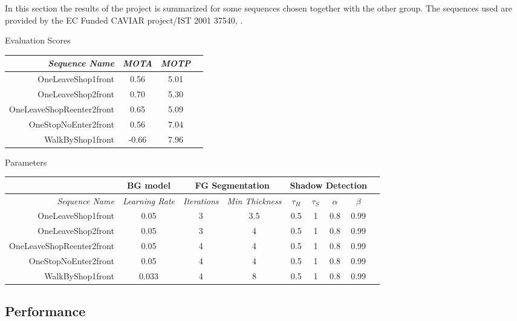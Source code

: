 In this section the results of the project is summarized for some sequences chosen together with the other group. The sequences used are provided by the EC Funded CAVIAR project/IST 2001 37540, \cite{CAVIAR}.

Evaluation Scores

\begin{center}
	\begin{tabular}{r | c | c | c }
		\emph{Sequence Name}		& \emph{MOTA} & \emph{MOTP} \\
		\hline \hline
		OneLeaveShop1front			& 0.56 & 5.01 \\
		OneLeaveShop2front			& 0.70 & 5.30 \\
		OneLeaveShopReenter2front	& 0.65 & 5.09 \\
		OneStopNoEnter2front 		& 0.56 & 7.04 \\
		WalkByShop1front 			& -0.66 & 7.96 \\
	\end{tabular}
\end{center}

Parameters

\begin{center}
	\begin{tabular}{r | c || c | c || c | c | c | c | c }
	&	\multicolumn{1}{|c||}{BG model} & \multicolumn{2}{c||}{FG Segmentation} &\multicolumn{4}{c|}{Shadow Detection} \\
		\hline
		\emph{Sequence Name} & \emph{Learning Rate} & \emph{Iterations} & \emph{Min Thickness} &\emph{$\tau_H$} & \emph{$\tau_S$} & \emph{$\alpha$} & \emph{$\beta$}\\ 
		\hline \hline
		OneLeaveShop1front			& 0.05 		& 3 & 3.5 	& 0.5 & 1 & 0.8 & 0.99\\
		OneLeaveShop2front			& 0.05 		& 3 & 4 	& 0.5 & 1 & 0.8 & 0.99\\
		OneLeaveShopReenter2front	& 0.05		& 4 & 4 	& 0.5 & 1 & 0.8 & 0.99\\
		OneStopNoEnter2front 		& 0.05 		& 4 & 4 	& 0.5 & 1 & 0.8 & 0.99\\
		WalkByShop1front 			& 0.033 	& 4 & 8 	& 0.5 & 1 & 0.8 & 0.99\\
	\end{tabular}
\end{center}

\subsection{Performance}


